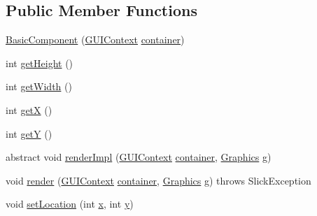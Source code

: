 \subsection*{Public Member Functions}
\begin{DoxyCompactItemize}
\item 
\mbox{\hyperlink{classorg_1_1newdawn_1_1slick_1_1gui_1_1_basic_component_aa6ad193e274c3020c806f4a3cca1d65e}{Basic\+Component}} (\mbox{\hyperlink{interfaceorg_1_1newdawn_1_1slick_1_1gui_1_1_g_u_i_context}{G\+U\+I\+Context}} \mbox{\hyperlink{classorg_1_1newdawn_1_1slick_1_1gui_1_1_abstract_component_af6d1abaa24da0b9a06fb153722e15435}{container}})
\item 
int \mbox{\hyperlink{classorg_1_1newdawn_1_1slick_1_1gui_1_1_basic_component_a53da61b4cd4697cc51796e72014425cd}{get\+Height}} ()
\item 
int \mbox{\hyperlink{classorg_1_1newdawn_1_1slick_1_1gui_1_1_basic_component_a8cc1fb3fadab77fd97a590cf19deff77}{get\+Width}} ()
\item 
int \mbox{\hyperlink{classorg_1_1newdawn_1_1slick_1_1gui_1_1_basic_component_ae991d0d3e651f6624d9fcd5ba1e959f0}{getX}} ()
\item 
int \mbox{\hyperlink{classorg_1_1newdawn_1_1slick_1_1gui_1_1_basic_component_a418061b7bfa93655d8aafaac9fe1ecb7}{getY}} ()
\item 
abstract void \mbox{\hyperlink{classorg_1_1newdawn_1_1slick_1_1gui_1_1_basic_component_ab10fd53ca7161571aadbb65ab21fa8d8}{render\+Impl}} (\mbox{\hyperlink{interfaceorg_1_1newdawn_1_1slick_1_1gui_1_1_g_u_i_context}{G\+U\+I\+Context}} \mbox{\hyperlink{classorg_1_1newdawn_1_1slick_1_1gui_1_1_abstract_component_af6d1abaa24da0b9a06fb153722e15435}{container}}, \mbox{\hyperlink{classorg_1_1newdawn_1_1slick_1_1_graphics}{Graphics}} g)
\item 
void \mbox{\hyperlink{classorg_1_1newdawn_1_1slick_1_1gui_1_1_basic_component_a6c4aa44c60d479678b628478ecc3a4ec}{render}} (\mbox{\hyperlink{interfaceorg_1_1newdawn_1_1slick_1_1gui_1_1_g_u_i_context}{G\+U\+I\+Context}} \mbox{\hyperlink{classorg_1_1newdawn_1_1slick_1_1gui_1_1_abstract_component_af6d1abaa24da0b9a06fb153722e15435}{container}}, \mbox{\hyperlink{classorg_1_1newdawn_1_1slick_1_1_graphics}{Graphics}} g)  throws Slick\+Exception 
\item 
void \mbox{\hyperlink{classorg_1_1newdawn_1_1slick_1_1gui_1_1_basic_component_aa98b14f3086fd9f9b9621c17c8481fcf}{set\+Location}} (int \mbox{\hyperlink{classorg_1_1newdawn_1_1slick_1_1gui_1_1_basic_component_ad0321d01a89b24e687e4e156fab90c67}{x}}, int \mbox{\hyperlink{classorg_1_1newdawn_1_1slick_1_1gui_1_1_basic_component_abca0dbce710368534eabb3f4168f47d5}{y}})
\end{DoxyCompactItemize}

